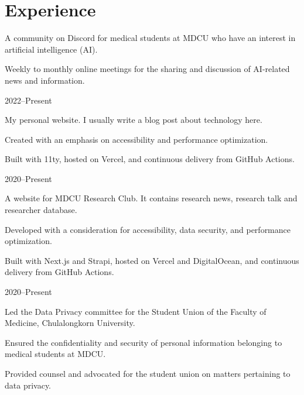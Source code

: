 \documentclass{cv}
\begin{document}
\section{Experience}
\begin{cv_table}
  {\begin{cv_itemize}
      \item A community on Discord for medical students at MDCU who have an interest in artificial intelligence (AI).
      \item Weekly to monthly online meetings for the sharing and discussion of AI-related news and information.
    \end{cv_itemize}
  }{}{2022--Present}
  {\begin{cv_itemize}
      \item My personal website. I usually write a blog post about technology here.
      \item Created with an emphasis on accessibility and performance optimization.
      \item Built with 11ty, hosted on Vercel, and continuous delivery from GitHub Actions.
    \end{cv_itemize}
  }{}{2020--Present}
  {\begin{cv_itemize}
      \item A website for MDCU Research Club. It contains research news, research talk and researcher database.
      \item Developed with a consideration for accessibility, data security, and performance optimization.
      \item Built with Next.js and Strapi, hosted on Vercel and DigitalOcean, and continuous delivery from GitHub Actions.
    \end{cv_itemize}
  }{}{2020--Present}
  {\begin{cv_itemize}
      \item Led the Data Privacy committee for the Student Union of the Faculty of Medicine, Chulalongkorn University.
      \item Ensured the confidentiality and security of personal information belonging to medical students at MDCU.
      \item Provided counsel and advocated for the student union on matters pertaining to data privacy.
    \end{cv_itemize}
}
\end{cv_table}
\end{document}
